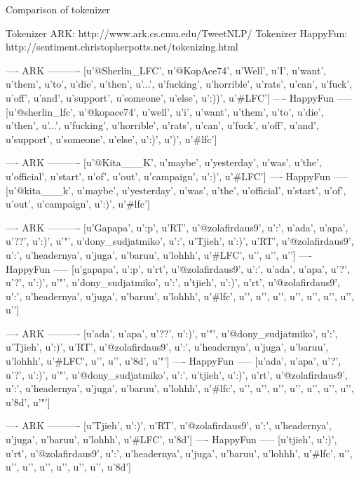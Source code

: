 Comparison of tokenizer

Tokenizer ARK: http://www.ark.cs.cmu.edu/TweetNLP/
Tokenizer HappyFun: http://sentiment.christopherpotts.net/tokenizing.html


---- ARK ----------
[u'@Sherlin_LFC', u'@KopAce74', u'Well', u'I', u'want', u'them', u'to', u'die', u'then', u'...', u'fucking', u'horrible', u'rats', u'can', u'fuck', u'off', u'and', u'support', u'someone', u'else', u':))', u'#LFC']
---- HappyFun -----
[u'@sherlin_lfc', u'@kopace74', u'well', u'i', u'want', u'them', u'to', u'die', u'then', u'...', u'fucking', u'horrible', u'rats', u'can', u'fuck', u'off', u'and', u'support', u'someone', u'else', u':)', u')', u'#lfc']


---- ARK ----------
[u'@Kita___K', u'maybe', u'yesterday', u'was', u'the', u'official', u'start', u'of', u'out', u'campaign', u':)', u'#LFC']
---- HappyFun -----
[u'@kita___k', u'maybe', u'yesterday', u'was', u'the', u'official', u'start', u'of', u'out', u'campaign', u':)', u'#lfc']


---- ARK ----------
[u'Gapapa', u':p', u'RT', u'@zolafirdaus9', u':', u'ada', u'apa', u'??', u':)', u'"', u'dony_sudjatmiko', u':', u'Tjieh', u':)', u'RT', u'@zolafirdaus9', u':', u'headernya', u'juga', u'baruu', u'lohhh', u'#LFC', u'\xed', u'\xbd\xed{}\xed', u'\xbd\xed{}\ufffd']
---- HappyFun -----
[u'gapapa', u':p', u'rt', u'@zolafirdaus9', u':', u'ada', u'apa', u'?', u'?', u':)', u'"', u'dony_sudjatmiko', u':', u'tjieh', u':)', u'rt', u'@zolafirdaus9', u':', u'headernya', u'juga', u'baruu', u'lohhh', u'#lfc', u'\xed', u'\xbd\xed', u'', u'', u'\xed', u'\xbd\xed', u'', u'\ufffd']


---- ARK ----------
[u'ada', u'apa', u'??', u':)', u'"', u'@dony_sudjatmiko', u':', u'Tjieh', u':)', u'RT', u'@zolafirdaus9', u':', u'headernya', u'juga', u'baruu', u'lohhh', u'#LFC', u'\xed', u'\xbd\xed{}\xed', u'\xbd\xed{}\x8d', u'"']
---- HappyFun -----
[u'ada', u'apa', u'?', u'?', u':)', u'"', u'@dony_sudjatmiko', u':', u'tjieh', u':)', u'rt', u'@zolafirdaus9', u':', u'headernya', u'juga', u'baruu', u'lohhh', u'#lfc', u'\xed', u'\xbd\xed', u'', u'', u'\xed', u'\xbd\xed', u'', u'\x8d', u'"']


---- ARK ----------
[u'Tjieh', u':)', u'RT', u'@zolafirdaus9', u':', u'headernya', u'juga', u'baruu', u'lohhh', u'#LFC', u'\xed{}\xbd\xed{}\xed{}\xbd\xed{}\x8d']
---- HappyFun -----
[u'tjieh', u':)', u'rt', u'@zolafirdaus9', u':', u'headernya', u'juga', u'baruu', u'lohhh', u'#lfc', u'\xed', u'\xbd\xed', u'', u'', u'\xed', u'\xbd\xed', u'', u'\x8d']


